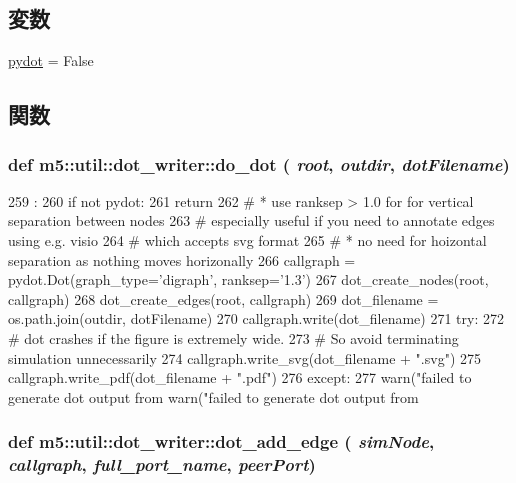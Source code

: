 \subsection*{変数}
\begin{DoxyCompactItemize}
\item 
\hyperlink{namespacem5_1_1util_1_1dot__writer_a31241ceacc46b6932a85d676d5a4ab8a}{pydot} = False
\end{DoxyCompactItemize}


\subsection{関数}
\hypertarget{namespacem5_1_1util_1_1dot__writer_ae1c22e483b943c09e1d17ebc09c4b5f2}{
\subsubsection[{do\_\-dot}]{\setlength{\rightskip}{0pt plus 5cm}def m5::util::dot\_\-writer::do\_\-dot ( {\em root}, \/   {\em outdir}, \/   {\em dotFilename})}}
\label{namespacem5_1_1util_1_1dot__writer_ae1c22e483b943c09e1d17ebc09c4b5f2}



\begin{DoxyCode}
259                                      :
260     if not pydot:
261         return
262     # * use ranksep > 1.0 for for vertical separation between nodes
263     # especially useful if you need to annotate edges using e.g. visio
264     # which accepts svg format
265     # * no need for hoizontal separation as nothing moves horizonally
266     callgraph = pydot.Dot(graph_type='digraph', ranksep='1.3')
267     dot_create_nodes(root, callgraph)
268     dot_create_edges(root, callgraph)
269     dot_filename = os.path.join(outdir, dotFilename)
270     callgraph.write(dot_filename)
271     try:
272         # dot crashes if the figure is extremely wide.
273         # So avoid terminating simulation unnecessarily
274         callgraph.write_svg(dot_filename + ".svg")
275         callgraph.write_pdf(dot_filename + ".pdf")
276     except:
277         warn("failed to generate dot output from %
        warn("failed to generate dot output from %
\end{DoxyCode}
\hypertarget{namespacem5_1_1util_1_1dot__writer_a1fff52253a51b807eca402644554e628}{
\subsubsection[{dot\_\-add\_\-edge}]{\setlength{\rightskip}{0pt plus 5cm}def m5::util::dot\_\-writer::dot\_\-add\_\-edge ( {\em simNode}, \/   {\em callgraph}, \/   {\em full\_\-port\_\-name}, \/   {\em peerPort})}}
\label{namespacem5_1_1util_1_1dot__writer_a1fff52253a51b807eca402644554e628}



